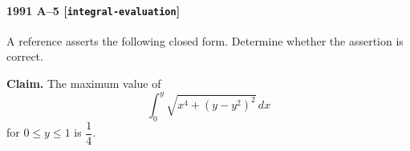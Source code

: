 \paragraph{1991 A--5 \textnormal{[\texttt{integral-evaluation}]}}
A reference asserts the following closed form. Determine whether the
assertion is correct.

\textbf{Claim.} The maximum value of
\[
\int_0^y \sqrt{x^4 + (y - y^2)^2}\,dx
\]
for $0 \le y \le 1$ is $\dfrac{1}{4}$.
